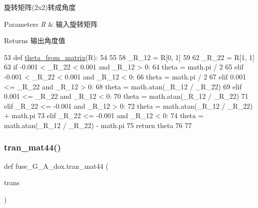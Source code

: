 旋转矩阵(2x2)转成角度 


\begin{DoxyParams}{Parameters}
{\em R} & 输入旋转矩阵\\
\hline
\end{DoxyParams}
\begin{DoxyReturn}{Returns}
输出角度值 
\end{DoxyReturn}

\begin{DoxyCode}
53 \textcolor{keyword}{def }\hyperlink{namespacefuse___g___a__dox_a3fb8553ee2aa4421c0b7e1931a0e06d3}{theta\_from\_matrix}(R):
54 
55     
58     \_R\_12 = R[0, 1]
59     
62     \_R\_22 = R[1, 1]
63     \textcolor{keywordflow}{if} -0.001 < \_R\_22 < 0.001 \textcolor{keywordflow}{and} \_R\_12 > 0:
64         theta = math.pi / 2
65     \textcolor{keywordflow}{elif} -0.001 < \_R\_22 < 0.001 \textcolor{keywordflow}{and} \_R\_12 < 0:
66         theta = math.pi / 2
67     \textcolor{keywordflow}{elif} 0.001 <= \_R\_22 \textcolor{keywordflow}{and} \_R\_12 > 0:
68         theta = math.atan(\_R\_12 / \_R\_22)
69     \textcolor{keywordflow}{elif} 0.001 <= \_R\_22 \textcolor{keywordflow}{and} \_R\_12 < 0:
70         theta = math.atan(\_R\_12 / \_R\_22)
71     \textcolor{keywordflow}{elif} \_R\_22 <= -0.001 \textcolor{keywordflow}{and} \_R\_12 > 0:
72         theta = math.atan(\_R\_12 / \_R\_22) + math.pi
73     \textcolor{keywordflow}{elif} \_R\_22 <= -0.001 \textcolor{keywordflow}{and} \_R\_12 < 0:
74         theta = math.atan(\_R\_12 / \_R\_22) - math.pi
75     \textcolor{keywordflow}{return} theta
76 
77 
\end{DoxyCode}
\mbox{\label{namespacefuse___g___a__dox_afffb200826c683d789ba1613b24f12ff}} 
\subsubsection{\texorpdfstring{tran\+\_\+mat44()}{tran\_mat44()}}
{\footnotesize\ttfamily def fuse\+\_\+\+G\+\_\+\+A\+\_\+dox.\+tran\+\_\+mat44 (\begin{DoxyParamCaption}\item[{}]{trans }\end{DoxyParamCaption})}



